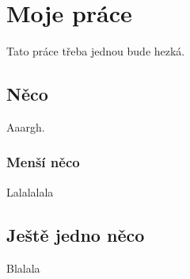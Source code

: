 \chapter{Moje práce}
Tato práce třeba jednou bude hezká.

\section{Něco}
Aaargh.
\subsection{Menší něco}
Lalalalala
\section{Ještě jedno něco}
Blalala